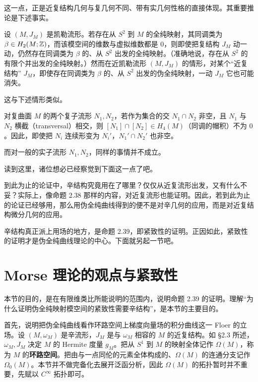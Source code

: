 
这一点，正是近复结构几何与复几何不同、带有实几何性格的直接体现。其重要推论是下述事实。

设 $(M,J_M)$ 是凯勒流形。若存在从 $S^2$ 到 $M$ 的全纯映射，其同调类为 $\beta\in H_2(M;\mathbb{Z})$，而该模空间的维数与虚拟维数都是 $0$，则即使把复结构 $J_M$ 动一动，仍然存在同调类为 $\beta$ 的、从 $S^2$ 出发的全纯映射。（准确地说，存在从 $S^2$ 的有限个并出发的全纯映射。）然而在近凯勒流形 $(M,J_M)$ 的情形，对某个“近复结构” $J_M$，即使存在同调类为 $\beta$ 的、从 $S^2$ 出发的伪全纯映射，一动 $J_M$ 它也可能消失。

这与下述情形类似。

对复曲面 $M$ 的两个复子流形 $N_1,N_2$，若作为集合的交 $N_1\cap N_2$ 非空，且 $N_1$ 与 $N_2$ 横截（transversal）相交，则 $[N_1]\cap[N_2]\in H_4(M)$（同调的帽积）不为 $0$。因此，即使把 $N_i$ 连续形变为 $N_i'$，$N_1'\cap N_2'$ 也非空。

而对一般的实子流形 $N_1,N_2$，同样的事情并不成立。

读到这里，诸位想必已经察觉到下面这一点了吧。

到此为止的论证中，辛结构究竟用在了哪里？仅仅从近复流形出发，又有什么不妥？实际上，像命题 2.38 那样的内容，对近复流形也能证明。因此，若到此为止的论证已经够用，那么用伪全纯曲线得到的便不是对辛几何的应用，而是对近复结构微分几何的应用。

辛结构真正派上用场的地方，是命题 2.39，即紧致性的证明。正因如此，紧致性的证明才是伪全纯曲线理论的中心。下面就另起一节吧。

\section{Morse 理论的观点与紧致性}

本节的目的，是在有限维类比所能说明的范围内，说明命题 2.39 的证明。理解“为什么证明伪全纯映射模空间的紧致性需要辛结构”，是本节的主要目的。


首先，说明把伪全纯曲线看作环路空间上梯度向量场的积分曲线这一 Floer 的立场。设 $(M,\omega_M)$ 是辛流形，$J_M$ 是与 $\omega_M$ 相容的 $M$ 的近复结构。如 §2.3 所述，$\omega_M,J_M$ 决定 $M$ 的 Hermite 度量 $g_M$。把从 $S^1$ 到 $M$ 的映射全体记作 $\Omega(M)$，称为 $M$ 的\textbf{环路空间}。把由与一点同伦的元素全体构成的、$\Omega(M)$ 的连通分支记作 $\Omega_0(M)$。本节并不做完备化去展开泛函分析，因此 $\Omega(M)$ 的拓扑暂时并不重要，先赋以 $C^\infty$ 拓扑即可。

